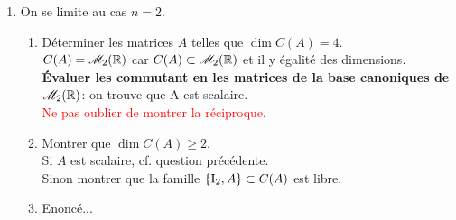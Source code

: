 \begin{enumerate}
\begin{itemize}
\begin{itemize}
        \end{itemize}
    \end{itemize}
    \item On se limite au cas $n = 2$. 
    \begin{enumerate}
        \item Déterminer les matrices $A$ telles que $\dim C(A) = 4$. \\
        $C(A) = \mathscr{M}_2(\mathbb{R})$ car $C(A) \subset \mathscr{M}_2(\mathbb{R})$ et il y égalité des dimensions. \\
        \textbf{Évaluer les commutant en les matrices de la base canoniques de $\mathscr{M}_2(\mathbb{R})$}: on trouve que A est scalaire. \\
        \textcolor{red}{Ne pas oublier de montrer la réciproque}. 
        \item Montrer que $\dim C(A) \geqslant 2$. \\
        Si $A$ est scalaire, cf. question précédente. \\
        Sinon montrer que la famille $\{ \mathrm{I}_2, A \} \subset C(A)$ est libre. 
        \item Enoncé... \\
    \end{enumerate}
\end{enumerate}